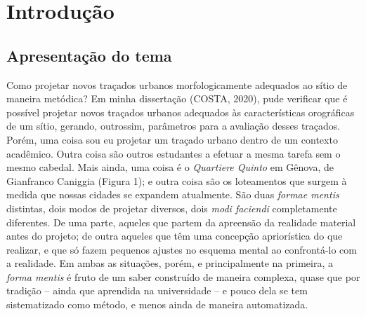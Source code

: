 \documentclass[twoside, 12pt]{book}
\begin{document}
\newpage

\section{Introdução}
    \maketitle

    
    \subsection{Apresentação do tema}	

        Como projetar novos traçados urbanos morfologicamente adequados ao sítio de maneira metódica? Em minha dissertação (COSTA, 2020), pude verificar que é possível projetar novos traçados urbanos adequados às características orográficas de um sítio, gerando, outrossim, parâmetros para a avaliação desses traçados. Porém, uma coisa sou eu projetar um traçado urbano dentro de um contexto acadêmico. Outra coisa são outros estudantes a efetuar a mesma tarefa sem o mesmo cabedal. Mais ainda, uma coisa é o \textit{Quartiere Quinto} em Gênova, de Gianfranco Caniggia (Figura 1); e outra coisa são os loteamentos que surgem à medida que nossas cidades se expandem atualmente. São duas \textit{formae mentis} distintas, dois modos de projetar diversos, dois \textit{modi faciendi} completamente diferentes. De uma parte, aqueles que partem da apreensão da realidade material antes do projeto;  de outra aqueles que têm uma concepção apriorística do que realizar, e que só fazem pequenos ajustes no esquema mental ao confrontá-lo com a realidade. Em ambas as situações, porém, e principalmente na primeira, a \textit{forma mentis} é fruto de um saber construído de maneira complexa, quase que por tradição – ainda que aprendida na universidade – e pouco dela se tem sistematizado como método, e menos ainda de maneira automatizada. 
\end{document}
